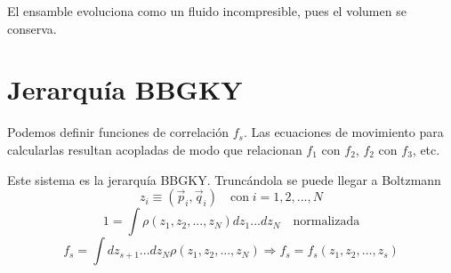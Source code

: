 \documentclass[10pt,oneside]{CBFT_book}
\begin{document}
El ensamble evoluciona como un fluido incompresible, pues el volumen se conserva.

 \section{Jerarquía BBGKY}

Podemos definir funciones de correlación $f_s$. Las ecuaciones de movimiento para calcularlas resultan
acopladas de modo que relacionan $f_1$ con $f_2$, $f_2$ con $f_3$, etc.

Este sistema es la jerarquía BBGKY. Truncándola se puede llegar a Boltzmann
\[
	z_i \equiv ( \vec{p}_i ,\vec{q}_i ) \quad \text{con} \; i = 1,2,...,N
\]
\[
	1 = \int \rho(z_1, z_2, ... ,z_N) dz_1 ... dz_N \quad \text{normalizada}
\]
\[
	f_s = \int dz_{s+1} ... dz_N \rho(z_1, z_2, ... ,z_N) \Rightarrow f_s = f_s(z_1, z_2, ... ,z_s)
\]
\end{document}
